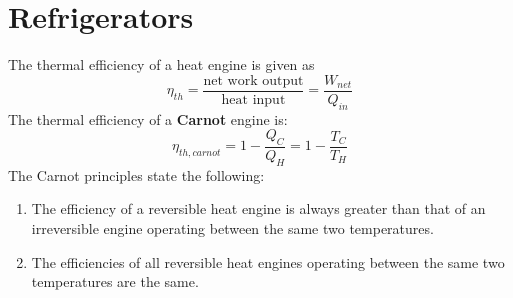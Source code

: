 \documentclass[11pt]{article}
\begin{document}
\section{Refrigerators}
The thermal efficiency of a heat engine is given as 
$$ \eta_{th} = \frac{\text{net work output}}{\text{heat input}} = \frac{W_{net}}{Q_{in}}$$
The thermal efficiency of a \textbf{Carnot} engine is:
$$\eta_{th, carnot} = 1 - \frac{Q_C}{Q_H} = 1 - \frac{T_C}{T_H}$$
The Carnot principles state the following:
\begin{enumerate}
\item The efficiency of a reversible heat engine is always greater than that of an irreversible engine operating between the same two temperatures.
\item The efficiencies of all reversible heat engines operating between the same two temperatures are the same.
\end{enumerate}
\end{document}
